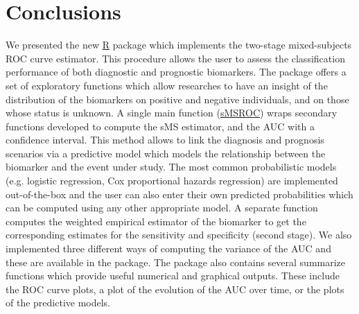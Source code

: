 \section{Conclusions}
We presented the new \url{R} package  which implements the two-stage mixed-subjects ROC curve estimator. This procedure allows the user to assess the classification performance of both diagnostic and prognostic biomarkers. The package offers a set of exploratory functions which allow researches to have an insight of the distribution of the biomarkers on positive and negative individuals, and on those whose status is unknown. 
A single main function ({\url{sMSROC}}) wraps secondary functions developed to compute the sMS estimator, and the AUC with a confidence interval.
This method allows to link the diagnosis and prognosis scenarios via a predictive model which models the relationship between the biomarker and the event under study. The most common probabilistic models (e.g. logistic regression, Cox proportional hazards regression) are implemented out-of-the-box and the user can also enter their own predicted probabilities which can be computed using any other appropriate model. A separate function computes the weighted empirical estimator of the biomarker to get the corresponding estimates for the sensitivity and specificity (second stage). 
We also implemented three different ways of computing the variance of the AUC and these are available in the package. The package also contains several summarize functions which provide useful numerical and graphical outputs. These include the ROC curve plots, a plot of the evolution of the AUC over time, or the plots of the predictive models. 

